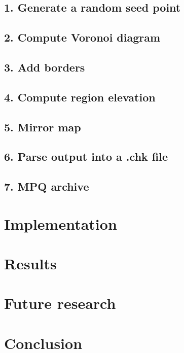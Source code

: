 \documentclass[letterpaper]{article}
\begin{document}
\subsection{1. Generate a random seed point}


\subsection{2. Compute Voronoi diagram}


\subsection{3. Add borders}


\subsection{4. Compute region elevation}


\subsection{5. Mirror map}


\subsection{6. Parse output into a .chk file}


\subsection{7. MPQ archive}


\section{Implementation} %
\label{sec:implementation}


\section{Results} %
\label{sec:results}


\section{Future research} %
\label{sec:future_research}


\section{Conclusion} %
\label{sec:conclusion}



% 
% 
\end{document}
